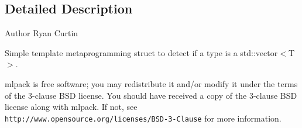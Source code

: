 \subsection{Detailed Description}
\begin{DoxyAuthor}{Author}
Ryan Curtin
\end{DoxyAuthor}
Simple template metaprogramming struct to detect if a type is a std\+::vector$<$\+T$>$.

mlpack is free software; you may redistribute it and/or modify it under the terms of the 3-\/clause B\+SD license. You should have received a copy of the 3-\/clause B\+SD license along with mlpack. If not, see {\tt http\+://www.\+opensource.\+org/licenses/\+B\+S\+D-\/3-\/\+Clause} for more information. 